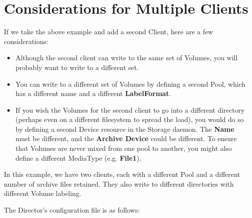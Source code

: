\label{MultipleClients}
\section{Considerations for Multiple Clients}

If we take the above example and add a second Client, here are a few
considerations: 

\begin{itemize}
\item Although the second client can write to the same set of  Volumes, you
   will probably want to write to a different  set. 
\item You can write to a different set of Volumes by defining  a second Pool,
   which has a different name and a different  {\bf LabelFormat}.  
\item If you wish the Volumes for the second client to go into  a different
   directory (perhaps even on a different filesystem  to spread the load), you
   would do so by defining a second  Device resource in the Storage daemon. The
{\bf Name}  must be different, and the {\bf Archive Device} could  be
different. To ensure that Volumes are never mixed from  one pool to another,
you might also define a different  MediaType (e.g. {\bf File1}). 
\end{itemize}

In this example, we have two clients, each with a different Pool and a
different number of archive files retained. They also write to different
directories with different Volume labeling. 

The Director's configuration file is as follows: 

